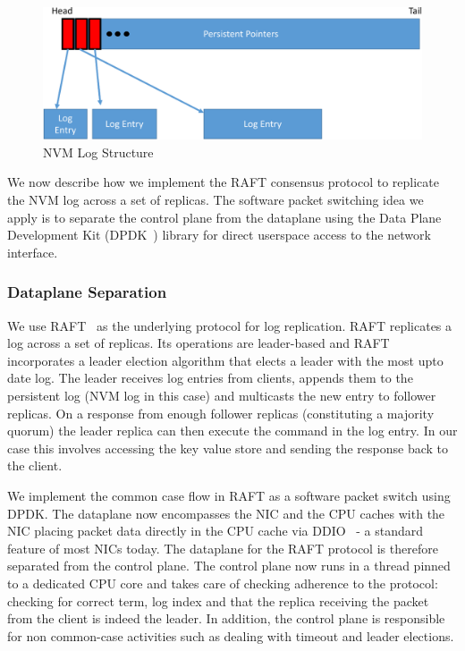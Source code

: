 \documentclass[10pt, preprint, nonatbib]{sigplanconf}
\begin{document}
\begin{figure}
\centering
\includegraphics[scale=0.3]{figures2/nvm_log.pdf}
\caption{NVM Log Structure}
\label{fig:nvm_log}
\end{figure}

We now describe how we implement the RAFT consensus protocol to replicate the
NVM log across a set of replicas. The software packet switching idea we apply is
to separate the control plane from the dataplane using the Data Plane
Development Kit (DPDK~\cite{dpdk}) library for direct userspace access to the
network interface.

\subsubsection{Dataplane Separation}
We use RAFT~\cite{raft} as the underlying protocol for log replication. RAFT
replicates a log across a set of replicas. Its operations are leader-based and
RAFT incorporates a leader election algorithm that elects a leader with the most
upto date log. The leader receives log entries from clients, appends them to the
persistent log (NVM log in this case) and multicasts the new entry to follower
replicas. On a response from enough follower replicas (constituting a majority
quorum) the leader replica can then execute the command in the log entry. In
our case this involves accessing the key value store and sending the response
back to the client.

We implement the common case flow in RAFT as a software packet switch using
DPDK. The dataplane now encompasses the NIC and the CPU caches with the NIC
placing packet data directly in the CPU cache via DDIO~\cite{ddio} - a standard
feature of most NICs today. The dataplane for the RAFT protocol is therefore
separated from the control plane. The control plane now runs in a thread pinned
to a dedicated CPU core and takes care of checking adherence to the protocol:
checking for correct term, log index and that the replica receiving the packet
from the client is indeed the leader. In addition, the control plane is
responsible for non common-case activities such as dealing with timeout and
leader elections.
\end{document}
